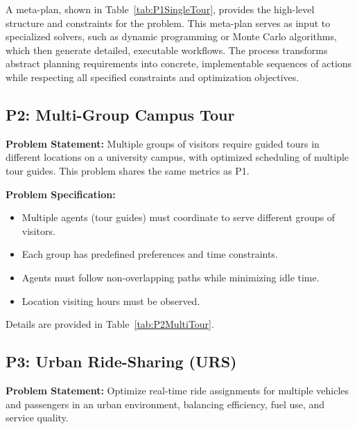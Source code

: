 A meta-plan, shown in Table~\ref{tab:P1SingleTour}, provides the high-level structure and constraints for the problem. This meta-plan serves as input to specialized solvers, such as dynamic programming or Monte Carlo algorithms, which then generate detailed, executable workflows. The process transforms abstract planning requirements into concrete, implementable sequences of actions while respecting all specified constraints and optimization objectives.

\subsection{P2: Multi-Group Campus Tour}
\textbf{Problem Statement:} Multiple groups of visitors require guided tours in different locations on a university campus, with optimized scheduling of multiple tour guides. This problem shares the same metrics as
P1.

\textbf{Problem Specification:}
\begin{itemize}[leftmargin=1.0em, topsep=-.0em, parsep=-.0em, label=-]
    \item Multiple agents (tour guides) must coordinate to serve different groups of visitors.
    \item Each group has predefined preferences and time constraints.
    \item Agents must follow non-overlapping paths while minimizing idle time.
    \item Location visiting hours must be observed.
\end{itemize}
\vspace{.1in}
Details are provided in Table~\ref{tab:P2MultiTour}.

\subsection{P3: Urban Ride-Sharing (URS)}
\textbf{Problem Statement:} Optimize real-time ride assignments for multiple vehicles and passengers in an urban environment, balancing efficiency, fuel use, and service quality.

